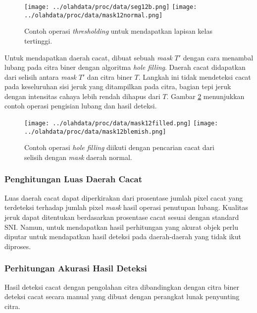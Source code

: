\documentclass[laporan.tex]{subfiles}
\begin{document}
\begin{figure}[h]
\centering
\texttt{[image: ../olahdata/proc/data/seg12b.png]} \qquad
\texttt{[image: ../olahdata/proc/data/mask12normal.png]}
\caption{Contoh operasi \emph{thresholding} untuk mendapatkan lapisan kelas tertinggi.}
\label{fig:highmask}
\end{figure}

Untuk mendapatkan daerah cacat, dibuat sebuah \emph{mask} $T'$ dengan cara menambal lubang pada citra biner dengan algoritma \emph{hole filling}. Daerah cacat didapatkan dari selisih antara \emph{mask} $T'$ dan citra biner $T$. Langkah ini tidak mendeteksi cacat pada keseluruhan sisi jeruk yang ditampilkan pada citra, bagian tepi jeruk dengan intensitas cahaya lebih rendah dihapus dari $T$. Gambar \ref{fig:holemask} menunjukkan contoh operasi pengisian lubang dan hasil deteksi.

\begin{figure}[h]
\centering
\texttt{[image: ../olahdata/proc/data/mask12filled.png]} \qquad
\texttt{[image: ../olahdata/proc/data/mask12blemish.png]}
\caption{Contoh operasi \emph{hole filling} diikuti dengan pencarian cacat dari selisih dengan \emph{mask} daerah normal.}
\label{fig:holemask}
\end{figure}

\subsubsection{Penghitungan Luas Daerah Cacat}

Luas daerah cacat dapat diperkirakan dari prosentase jumlah pixel cacat yang terdeteksi terhadap jumlah pixel \emph{mask} hasil operasi penutupan lubang. Kualitas jeruk dapat ditentukan berdasarkan prosentase cacat sesuai dengan standard SNI. Namun, untuk mendapatkan hasil perhitungan yang akurat objek perlu diputar untuk mendapatkan hasil deteksi pada daerah-daerah yang tidak ikut diproses.

\subsubsection{Perhitungan Akurasi Hasil Deteksi}

Hasil deteksi cacat dengan pengolahan citra dibandingkan dengan citra biner deteksi cacat secara manual yang dibuat dengan perangkat lunak penyunting citra.
\end{document}
